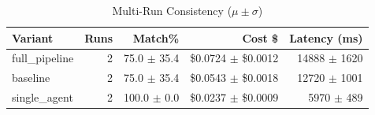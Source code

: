 \begin{table}[htbp]
\centering
\caption{Multi-Run Consistency ($\mu \pm \sigma$)}
\label{tab:consistency}
\begin{tabular}{l r rrr}
\toprule
Variant & Runs & Match\% & Cost \$ & Latency (ms) \\
\midrule
  full\_pipeline & 2 & 75.0 $\pm$ 35.4 & \$0.0724 $\pm$ \$0.0012 & 14888 $\pm$ 1620 \\
  baseline & 2 & 75.0 $\pm$ 35.4 & \$0.0543 $\pm$ \$0.0018 & 12720 $\pm$ 1001 \\
  single\_agent & 2 & 100.0 $\pm$ 0.0 & \$0.0237 $\pm$ \$0.0009 & 5970 $\pm$ 489 \\
\bottomrule
\end{tabular}
\end{table}
